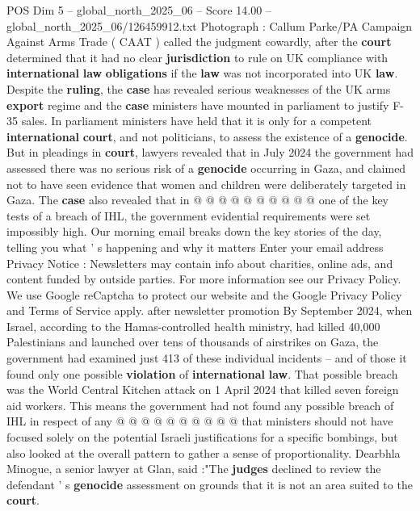 \begin{textsample}{POS Dim 5 – global\_north\_2025\_06 – Score 14.00 – global\_north\_2025\_06/126459912.txt}
Photograph : Callum Parke/PA Campaign Against Arms Trade ( CAAT ) called the judgment cowardly, after the \textbf{court} determined that it had no clear \textbf{jurisdiction} to rule on UK compliance with \textbf{international} \textbf{law} \textbf{obligations} if the \textbf{law} was not incorporated into UK \textbf{law}.
Despite the \textbf{ruling}, the \textbf{case} has revealed serious weaknesses of the UK arms \textbf{export} regime and the \textbf{case} ministers have mounted in parliament to justify F-35 sales.
In parliament ministers have held that it is only for a competent \textbf{international} \textbf{court}, and not politicians, to assess the existence of a \textbf{genocide}.
But in pleadings in \textbf{court}, lawyers revealed that in July 2024 the government had assessed there was no serious risk of a \textbf{genocide} occurring in Gaza, and claimed not to have seen evidence that women and children were deliberately targeted in Gaza.
The \textbf{case} also revealed that in @ @ @ @ @ @ @ @ @ @ one of the key tests of a breach of IHL, the government evidential requirements were set impossibly high.
Our morning email breaks down the key stories of the day, telling you what ' s happening and why it matters Enter your email address Privacy Notice : Newsletters may contain info about charities, online ads, and content funded by outside parties.
For more information see our Privacy Policy.
We use Google reCaptcha to protect our website and the Google Privacy Policy and Terms of Service apply. after newsletter promotion By September 2024, when Israel, according to the Hamas-controlled health ministry, had killed 40,000 Palestinians and launched over tens of thousands of airstrikes on Gaza, the government had examined just 413 of these individual incidents -- and of those it found only one possible \textbf{violation} of \textbf{international} \textbf{law}.
That possible breach was the World Central Kitchen attack on 1 April 2024 that killed seven foreign aid workers.
This means the government had not found any possible breach of IHL in respect of any @ @ @ @ @ @ @ @ @ @ that ministers should not have focused solely on the potential Israeli justifications for a specific bombings, but also looked at the overall pattern to gather a sense of proportionality.
Dearbhla Minogue, a senior lawyer at Glan, said :"The \textbf{judges} declined to review the defendant ' s \textbf{genocide} assessment on grounds that it is not an area suited to the \textbf{court}.

\end{textsample}
